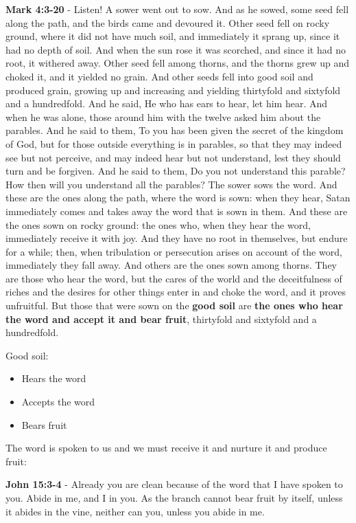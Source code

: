 \documentclass[11pt]{article}
\begin{document}
\textbf{Mark 4:3-20} - Listen! A sower went out to sow.  And as he sowed, some seed fell along the path, and the birds came and devoured it.  Other seed fell on rocky ground, where it did not have much soil, and immediately it sprang up, since it had no depth of soil.  And when the sun rose it was scorched, and since it had no root, it withered away.  Other seed fell among thorns, and the thorns grew up and choked it, and it yielded no grain.  And other seeds fell into good soil and produced grain, growing up and increasing and yielding thirtyfold and sixtyfold and a hundredfold.  And he said, He who has ears to hear, let him hear.  And when he was alone, those around him with the twelve asked him about the parables.  And he said to them, To you has been given the secret of the kingdom of God, but for those outside everything is in parables, so that they may indeed see but not perceive, and may indeed hear but not understand, lest they should turn and be forgiven.  And he said to them, Do you not understand this parable? How then will you understand all the parables?  The sower sows the word.  And these are the ones along the path, where the word is sown: when they hear, Satan immediately comes and takes away the word that is sown in them.  And these are the ones sown on rocky ground: the ones who, when they hear the word, immediately receive it with joy.  And they have no root in themselves, but endure for a while; then, when tribulation or persecution arises on account of the word, immediately they fall away.  And others are the ones sown among thorns. They are those who hear the word, but the cares of the world and the deceitfulness of riches and the desires for other things enter in and choke the word, and it proves unfruitful.  But those that were sown on the \textbf{good soil} are \textbf{the ones who hear the word and accept it and bear fruit}, thirtyfold and sixtyfold and a hundredfold.

Good soil:
\begin{itemize}
\item Hears the word
\item Accepts the word
\item Bears fruit
\end{itemize}

The word is spoken to us and we must receive it and nurture it and produce fruit:

\textbf{John 15:3-4} - Already you are clean because of the word that I have spoken to you. Abide in me, and I in you. As the branch cannot bear fruit by itself, unless it abides in the vine, neither can you, unless you abide in me.
\end{document}
